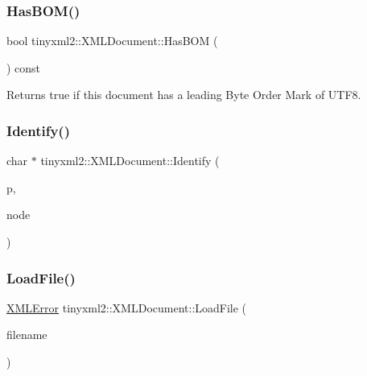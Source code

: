 \subsubsection{\texorpdfstring{Has\+B\+O\+M()}{HasBOM()}}
{\footnotesize\ttfamily bool tinyxml2\+::\+X\+M\+L\+Document\+::\+Has\+B\+OM (\begin{DoxyParamCaption}{ }\end{DoxyParamCaption}) const\hspace{0.3cm}{\ttfamily [inline]}}

Returns true if this document has a leading Byte Order Mark of U\+T\+F8. \mbox{\label{classtinyxml2_1_1_x_m_l_document_a25827d1bec509ad566a107e5853ed040}} 
\subsubsection{\texorpdfstring{Identify()}{Identify()}}
{\footnotesize\ttfamily char $\ast$ tinyxml2\+::\+X\+M\+L\+Document\+::\+Identify (\begin{DoxyParamCaption}\item[{char $\ast$}]{p,  }\item[{\hyperlink{classtinyxml2_1_1_x_m_l_node}{X\+M\+L\+Node} $\ast$$\ast$}]{node }\end{DoxyParamCaption})}

\mbox{\label{classtinyxml2_1_1_x_m_l_document_a2ebd4647a8af5fc6831b294ac26a150a}} 
\subsubsection{\texorpdfstring{Load\+File()}{LoadFile()}\hspace{0.1cm}{\footnotesize\ttfamily [1/2]}}
{\footnotesize\ttfamily \hyperlink{namespacetinyxml2_a1fbf88509c3ac88c09117b1947414e08}{X\+M\+L\+Error} tinyxml2\+::\+X\+M\+L\+Document\+::\+Load\+File (\begin{DoxyParamCaption}\item[{const char $\ast$}]{filename }\end{DoxyParamCaption})}


